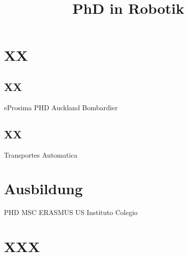 \documentclass[11pt,a4paper,sans]{moderncv}        %
\title{PhD in Robotik}               %
\begin{document}
\makecvtitle

\section{XX}
\subsection{XX}
eProsima
PHD
Auckland
Bombardier
\subsection{ XX }
Transportes
Automatica

\section{Ausbildung}
PHD
MSC
ERASMUS
US
Instituto
Colegio



\section{XXX}

\newpage
\end{document}
